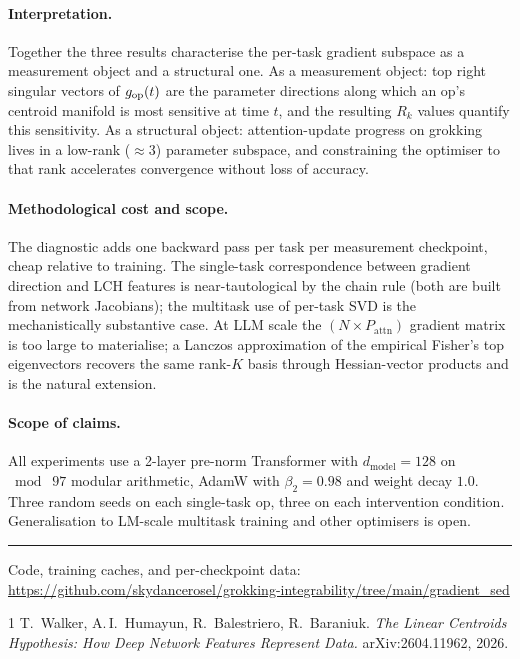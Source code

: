 \documentclass[11pt]{article}
\begin{document}
\paragraph{Interpretation.}
Together the three results characterise the per-task gradient
subspace as a measurement object and a structural one. As a
measurement object: top right singular vectors of $g_{\rm op}(t)$
are the parameter directions along which an op's centroid
manifold is most sensitive at time $t$, and the resulting
$R_k$ values quantify this sensitivity. As a structural object:
attention-update progress on grokking lives in a low-rank
($\approx 3$) parameter subspace, and constraining the optimiser
to that rank accelerates convergence without loss of accuracy.

\paragraph{Methodological cost and scope.}
The diagnostic adds one backward pass per task per measurement
checkpoint, cheap relative to training. The single-task
correspondence between gradient direction and LCH features is
near-tautological by the chain rule (both are built from network
Jacobians); the multitask use of per-task SVD is the
mechanistically substantive case. At LLM scale the
$(N \times P_\text{attn})$ gradient matrix is too large to
materialise; a Lanczos approximation of the empirical Fisher's
top eigenvectors recovers the same rank-$K$ basis through
Hessian-vector products and is the natural extension.

\paragraph{Scope of claims.}
All experiments use a 2-layer pre-norm Transformer with
$d_\text{model}{=}128$ on $\bmod\;97$ modular arithmetic, AdamW
with $\beta_2{=}0.98$ and weight decay $1.0$. Three random seeds
on each single-task op, three on each intervention condition.
Generalisation to LM-scale multitask training and other
optimisers is open.

\noindent\rule{\linewidth}{0.4pt}
{\footnotesize Code, training caches, and per-checkpoint data:
\url{https://github.com/skydancerosel/grokking-integrability/tree/main/gradient_sed}}

\begin{thebibliography}{1}
T.\ Walker, A.\,I.\ Humayun, R.\ Balestriero, R.\ Baraniuk.
\emph{The Linear Centroids Hypothesis: How Deep Network Features
Represent Data.} arXiv:2604.11962, 2026.
\end{thebibliography}
\end{document}
